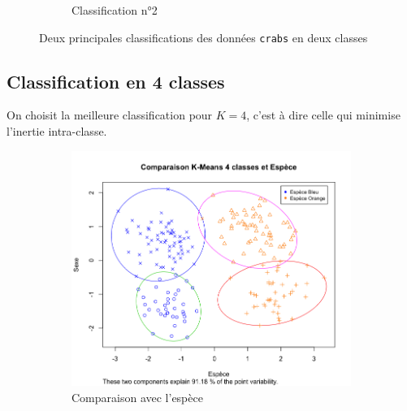 \documentclass[a4paper,10pt]{report}
\begin{document}
\begin{figure}[H]
\begin{subfigure}[b]{0.5\linewidth}
		\caption{\small Classification n°2}
		\label{fig:3-2-1-crabs-2-classes-classif-2-sex}
	\end{subfigure}%
	\caption{\small Deux principales classifications des données \texttt{crabs} en deux classes}
	\label{fig:3-2-1-Crabs-kmeans-2-classes}
\end{figure}





\subsection{Classification en 4 classes}

On choisit la meilleure classification pour $K = 4$, c'est à dire celle qui minimise l'inertie intra-classe.


\begin{figure}[H]
	\centering
	\captionsetup{justification=centering, margin=2cm}
	\begin{subfigure}[b]{0.5\linewidth}
		\centering
		\captionsetup{justification=centering}
		\includegraphics[width=1\linewidth]{img/3-2-2-crabs-kmeans-4-classes-espece}
		\caption{\small Comparaison avec l'espèce}
		\label{fig:3-2-2-crabs-kmeans-4-classes-espece}
	\end{subfigure}%
	\begin{subfigure}[b]{0.5\linewidth}
		\centering
		\captionsetup{justification=centering}

\end{subfigure}
\end{figure}
\end{document}
